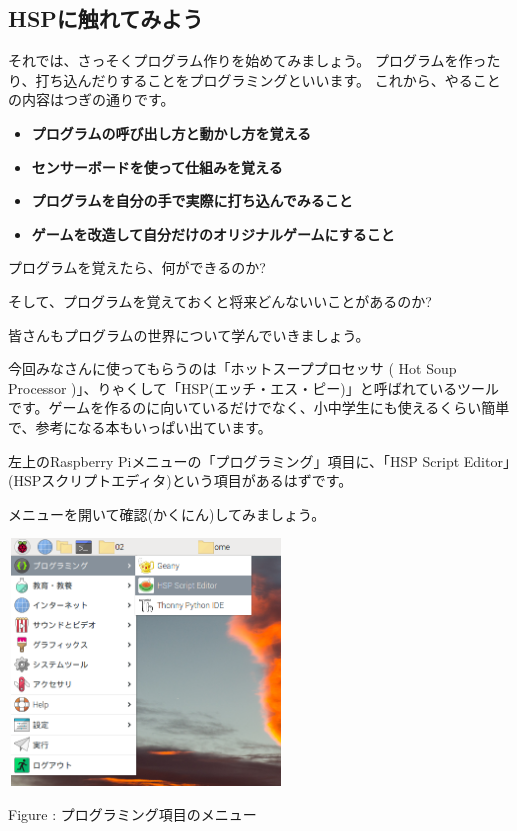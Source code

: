 \documentclass[a4paper,12pt]{jarticle}
\newcounter{Figure}
\renewcommand\theFigure{\arabic{Figure}}
\begin{document}
\bigskip
\bigskip
\bigskip

\bigskip

\clearpage
\subsection{HSPに触れてみよう}
\bigskip
\bigskip

それでは、さっそくプログラム作りを始めてみましょう。
プログラムを作ったり、打ち込んだりすることをプログラミングといいます。
これから、やることの内容はつぎの通りです。

\bigskip

\begin{itemize}
\item {\bfseries
プログラムの呼び出し方と動かし方を覚える}
\item {\bfseries
センサーボードを使って仕組みを覚える}
\item {\bfseries
プログラムを自分の手で実際に打ち込んでみること}
\item {\bfseries
ゲームを改造して自分だけのオリジナルゲームにすること}
\end{itemize}

\bigskip

プログラムを覚えたら、何ができるのか?

そして、プログラムを覚えておくと将来どんないいことがあるのか?

皆さんもプログラムの世界について学んでいきましょう。

今回みなさんに使ってもらうのは「ホットスーププロセッサ ( Hot Soup Processor )」、りゃくして「HSP(エッチ・エス・ピー)」と呼ばれているツールです。ゲームを作るのに向いているだけでなく、小中学生にも使えるくらい簡単で、参考になる本もいっぱい出ています。


\bigskip

\bigskip

左上のRaspberry Piメニューの「プログラミング」項目に、「HSP Script Editor」(HSPスクリプトエディタ)という項目があるはずです。

メニューを開いて確認(かくにん)してみましょう。

\bigskip
\bigskip

\begin{minipage}{9.781cm}
\centering
{\upshape
\includegraphics[keepaspectratio,width=7.31cm,height=6.562cm]{text02-img/s_hspmenu.png}
\flushleft

Figure \stepcounter{Figure}{\theFigure}: プログラミング項目のメニュー}
\end{minipage}
\end{document}
